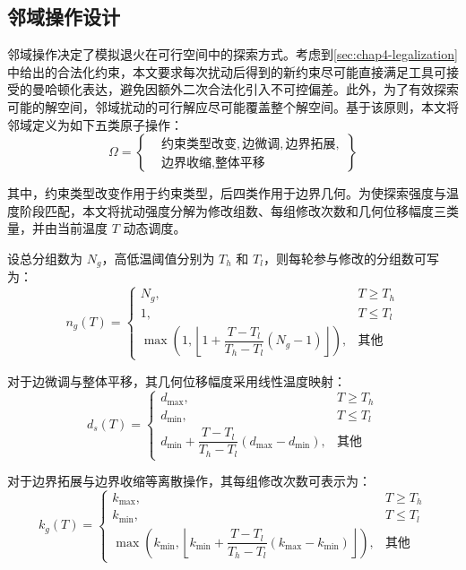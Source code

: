 \subsection{邻域操作设计}
\label{sec:chap4-neighborhood}
邻域操作决定了模拟退火在可行空间中的探索方式。考虑到\ref{sec:chap4-legalization}中给出的合法化约束，本文要求每次扰动后得到的新约束尽可能直接满足工具可接受的曼哈顿化表达，避免因额外二次合法化引入不可控偏差。此外，为了有效探索可能的解空间，邻域扰动的可行解应尽可能覆盖整个解空间。基于该原则，本文将邻域定义为如下五类原子操作：
\begin{equation}
\label{eq:chap4-neighbor-op-set}
\Omega=\left\{
\begin{aligned}
&\text{约束类型改变},\text{边微调},\text{边界拓展},\\
&\text{边界收缩},\text{整体平移}
\end{aligned}
\right\}
\end{equation}

其中，约束类型改变作用于约束类型，后四类作用于边界几何。为使探索强度与温度阶段匹配，本文将扰动强度分解为修改组数、每组修改次数和几何位移幅度三类量，并由当前温度 $T$ 动态调度。

设总分组数为 $N_g$，高低温阈值分别为 $T_h$ 和 $T_l$，则每轮参与修改的分组数可写为：
\begin{equation}
\label{eq:chap4-neighbor-group-schedule}
n_g(T)=
\begin{cases}
N_g, & T\ge T_h \\
1, & T\le T_l \\
\max\left(1,\left\lfloor 1+\dfrac{T-T_l}{T_h-T_l}(N_g-1)\right\rfloor\right), & \text{其他}
\end{cases}
\end{equation}

对于边微调与整体平移，其几何位移幅度采用线性温度映射：
\begin{equation}
\label{eq:chap4-neighbor-shift-schedule}
d_s(T)=
\begin{cases}
d_{\max}, & T\ge T_h \\
d_{\min}, & T\le T_l \\
d_{\min}+\dfrac{T-T_l}{T_h-T_l}(d_{\max}-d_{\min}), & \text{其他}
\end{cases}
\end{equation}

对于边界拓展与边界收缩等离散操作，其每组修改次数可表示为：
\begin{equation}
\label{eq:chap4-neighbor-repeat-schedule}
k_g(T)=
\begin{cases}
k_{\max}, & T\ge T_h \\
k_{\min}, & T\le T_l \\
\max\left(k_{\min},\left\lfloor k_{\min}+\dfrac{T-T_l}{T_h-T_l}(k_{\max}-k_{\min})\right\rfloor\right), & \text{其他}
\end{cases}
\end{equation}

